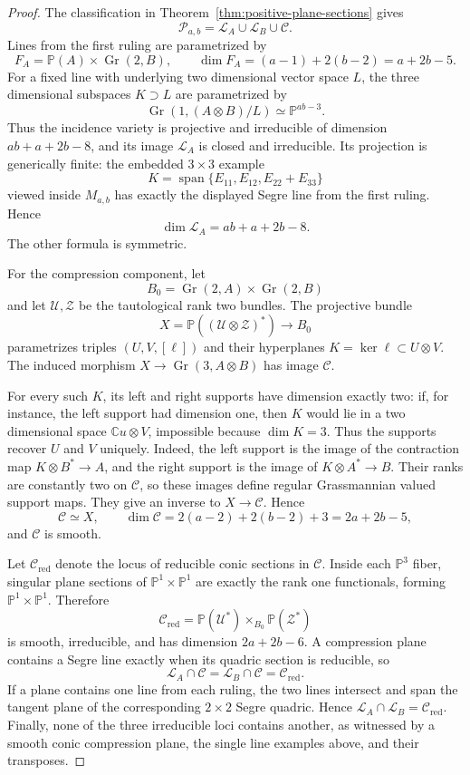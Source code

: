 \documentclass[10pt,a4paper]{amsart}
\newcommand{\Gr}{\operatorname{Gr}}
\newcommand{\Span}{\operatorname{span}}
\newcommand{\chg}[1]{#1}
\begin{document}
\begin{proof}
The classification in Theorem~\ref{thm:positive-plane-sections} gives
\[
\mathcal P_{a,b}=\mathcal L_A\cup\mathcal L_B\cup\mathcal C.
\]
Lines from the first ruling are parametrized by
\[
F_A=\mathbb P(A)\times\Gr(2,B),
\qquad
\dim F_A=(a-1)+2(b-2)=a+2b-5.
\]
For a fixed line with underlying \chg{two dimensional} vector space $L$, the \chg{three dimensional} subspaces $K\supset L$ are parametrized by
\[
\Gr(1,(A\otimes B)/L)\simeq\mathbb P^{ab-3}.
\]
Thus the incidence variety is projective and irreducible of dimension $ab+a+2b-8$, and its image $\mathcal L_A$ is closed and irreducible. Its projection is generically finite: the embedded $3\times3$ example
\[
K=\Span\{E_{11},E_{12},E_{22}+E_{33}\}
\]
viewed inside $M_{a,b}$ has exactly the displayed Segre line from the first ruling. Hence
\[
\dim\mathcal L_A=ab+a+2b-8.
\]
The other formula is symmetric.

For the compression component, let
\[
B_0=\Gr(2,A)\times\Gr(2,B)
\]
and let $\mathcal U,\mathcal Z$ be the tautological rank two bundles. The projective bundle
\[
X=\mathbb P((\mathcal U\otimes\mathcal Z)^*)\longrightarrow B_0
\]
parametrizes triples $(U,V,[\ell])$ and their hyperplanes $K=\ker\ell\subset U\otimes V$. The induced morphism $X\to\Gr(3,A\otimes B)$ has image $\mathcal C$.

For every such $K$, its left and right supports have dimension exactly two: if, for instance, the left support had dimension one, then $K$ would lie in a \chg{two dimensional} space $\mathbb Cu\otimes V$, impossible because $\dim K=3$. Thus the supports recover $U$ and $V$ uniquely. Indeed, the left support is the image of the contraction map $K\otimes B^*\to A$, and the right support is the image of $K\otimes A^*\to B$. Their ranks are constantly two on $\mathcal C$, so these images define regular \chg{Grassmannian valued} support maps. They give an inverse to $X\to\mathcal C$. Hence
\[
\mathcal C\simeq X,
\qquad
\dim\mathcal C=2(a-2)+2(b-2)+3=2a+2b-5,
\]
and $\mathcal C$ is smooth.

{Let $\mathcal C_{\mathrm{red}}$ denote the locus of reducible conic sections in $\mathcal C$.}
Inside each $\mathbb P^3$ fiber, singular plane sections of $\mathbb P^1\times\mathbb P^1$ are exactly the \chg{rank one} functionals, forming $\mathbb P^1\times\mathbb P^1$. Therefore
\[
{\mathcal C_{\mathrm{red}}}
=\mathbb P(\mathcal U^*)\times_{B_0}\mathbb P(\mathcal Z^*)
\]
is smooth, irreducible, and has dimension $2a+2b-6$. A compression plane contains a Segre line exactly when its quadric section is reducible, so
\[
\mathcal L_A\cap\mathcal C
=\mathcal L_B\cap\mathcal C
={\mathcal C_{\mathrm{red}}}.
\]
If a plane contains one line from each ruling, the two lines intersect and span the tangent plane of the corresponding $2\times2$ Segre quadric. Hence $\mathcal L_A\cap\mathcal L_B={\mathcal C_{\mathrm{red}}}$. Finally, none of the three irreducible loci contains another, as witnessed by a \chg{smooth conic compression plane}, the \chg{single line examples} above, and their transposes.
\end{proof}
\end{document}
